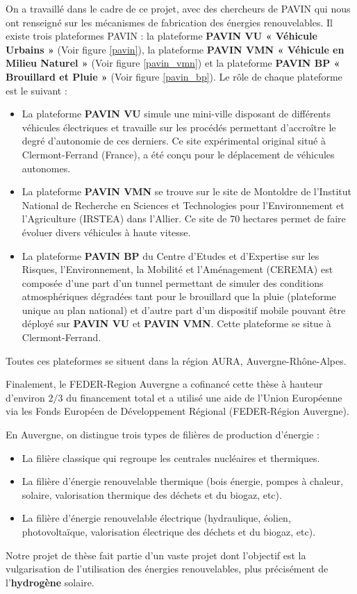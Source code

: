   On a travaillé dans le cadre de ce projet, avec des chercheurs de PAVIN qui nous ont renseigné sur les mécanismes de fabrication des énergies renouvelables. Il existe trois plateformes PAVIN : la plateforme \textbf{PAVIN VU « Véhicule Urbains »} (Voir figure	\ref{pavin}), la plateforme \textbf{PAVIN VMN « Véhicule en Milieu Naturel »} (Voir figure	\ref{pavin_vmn}) et la plateforme \textbf{PAVIN BP « Brouillard et Pluie »} (Voir figure	\ref{pavin_bp}). Le rôle de chaque plateforme est le suivant :
  \begin{itemize}[label=$\square$]
 
  \item  La plateforme \textbf{PAVIN VU} simule une mini-ville disposant de différents véhicules électriques et travaille sur les procédés permettant d'accroître le degré d'autonomie de ces derniers.  Ce site expérimental original situé à Clermont-Ferrand (France), a été conçu pour le déplacement de véhicules autonomes. 
  \item La plateforme \textbf{PAVIN VMN} se trouve sur le site de Montoldre de l'Institut National de Recherche en Sciences et Technologies pour l'Environnement et l'Agriculture (IRSTEA) dans l'Allier. Ce site de 70 hectares permet de faire évoluer divers véhicules à haute vitesse.
  \item  La plateforme \textbf{PAVIN BP} du Centre d'Etudes et d'Expertise sur les Risques, l'Environnement, la Mobilité et l'Aménagement (CEREMA) est composée d'une part d'un tunnel permettant de simuler des conditions atmosphériques dégradées tant pour le brouillard que la pluie (plateforme unique au plan national) et d'autre part d'un dispositif mobile pouvant être déployé sur \textbf{PAVIN VU} et \textbf{PAVIN VMN}. Cette plateforme se situe à Clermont-Ferrand.
\end{itemize}
Toutes ces plateformes se situent dans la région AURA, Auvergne-Rhône-Alpes.

Finalement, le FEDER-Region Auvergne a cofinancé cette thèse à hauteur d'environ $2/3$ du financement total et a utilisé une aide de l'Union Européenne via les Fonds Européen de Développement Régional (FEDER-Région Auvergne). %
 
En Auvergne, on distingue trois types de filières de production d'énergie : 
\begin{itemize}[label=$\square$]
	
	\item La filière classique qui regroupe les centrales nucléaires et thermiques. 
		\item La filière d'énergie renouvelable thermique (bois énergie, pompes à chaleur, solaire, valorisation thermique des déchets et du biogaz, etc). 
			\item La filière d'énergie renouvelable électrique (hydraulique, éolien, photovoltaïque, valorisation électrique des déchets et du biogaz, etc). 
\end{itemize}
Notre projet de thèse fait partie d'un vaste projet dont l'objectif est la vulgarisation de l'utilisation des énergies renouvelables, plus précisément de l'\textbf{hydrogène} solaire.

